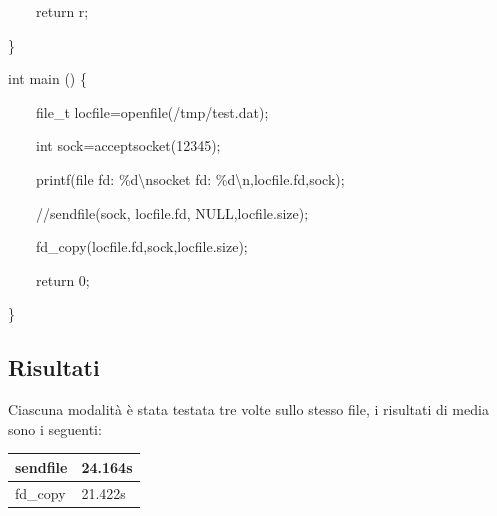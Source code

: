 \documentclass[a4paper,11pt]{article}
\begin{document}
{\ttfamily
\ \ \ \ return r;}

{\ttfamily
\}}


\bigskip

{\ttfamily
int main () \{}

{\ttfamily
\ \ \ \ file\_t
locfile=openfile({\textquotedbl}/tmp/test.dat{\textquotedbl});}

{\ttfamily
\ \ \ \ int sock=acceptsocket(12345);}


\bigskip

{\ttfamily
\ \ \ \ printf({\textquotedbl}file fd: \%d{\textbackslash}nsocket fd:
\%d{\textbackslash}n{\textquotedbl},locfile.fd,sock);}

{\ttfamily
\ \ \ \ //sendfile(sock, locfile.fd, NULL,locfile.size);}

{\ttfamily
\ \ \ \ fd\_copy(locfile.fd,sock,locfile.size);}

{\ttfamily
\ \ \ \ return 0;}

{\ttfamily
\}}

\subsection{Risultati}
{\sffamily
Ciascuna modalit\`a \`e stata testata tre volte sullo stesso file, i
risultati di media sono i seguenti:}

\begin{flushleft}
\tablehead{}
\begin{supertabular}{|m{3.291cm}|m{5.859cm}|}
\hline
\sffamily sendfile &
\sffamily 24.164s\\\hline
\sffamily fd\_copy &
\sffamily 21.422s\\\hline
\end{supertabular}
\end{flushleft}
\end{document}
